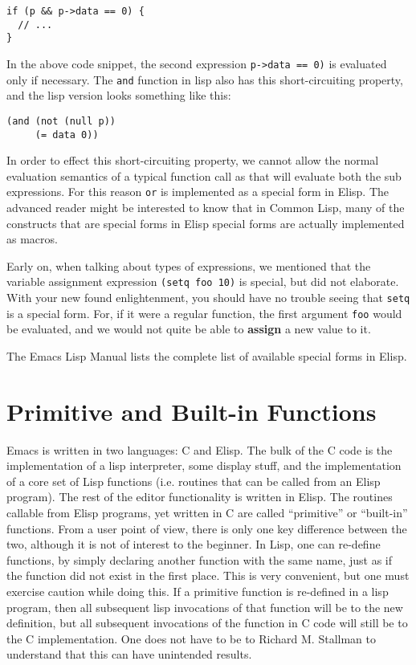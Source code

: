 \documentclass[10pt]{article}
\begin{document}
\begin{verbatim}
if (p && p->data == 0) {
  // ...
}
\end{verbatim}

In the above code snippet, the second expression \texttt{p->data == 0)} is
evaluated only if necessary.  The \texttt{and} function in lisp also has this
short-circuiting property, and the lisp version looks something like this:

\begin{verbatim}
(and (not (null p))
     (= data 0))
\end{verbatim}

In order to effect this short-circuiting property, we cannot allow the normal
evaluation semantics of a typical function call as that will evaluate both the
sub expressions.  For this reason \texttt{or} is implemented as a special form
in Elisp.  The advanced reader might be interested to know that in Common Lisp,
many of the constructs that are special forms in Elisp special forms are
actually implemented as macros.

Early on, when talking about types of expressions, we mentioned that the
variable assignment expression \texttt{(setq foo 10)} is special, but did not
elaborate.  With your new found enlightenment, you should have no trouble
seeing that \texttt{setq} is a special form.  For, if it were a regular
function, the first argument \texttt{foo} would be evaluated, and we would not
quite be able to \textbf{assign} a new value to it.

The Emacs Lisp Manual lists the complete list of available special forms in
Elisp.

\section{Primitive and Built-in Functions}

Emacs is written in two languages: C and Elisp.  The bulk of the C code is the
implementation of a lisp interpreter, some display stuff, and the
implementation of a core set of Lisp functions (i.e. routines that can be
called from an Elisp program).  The rest of the editor functionality is written
in Elisp.  The routines callable from Elisp programs, yet written in C are
called ``primitive'' or ``built-in'' functions.  From a user point of view,
there is only one key difference between the two, although it is not of
interest to the beginner.  In Lisp, one can re-define functions, by simply
declaring another function with the same name, just as if the function did not
exist in the first place.  This is very convenient, but one must exercise
caution while doing this.  If a primitive function is re-defined in a lisp
program, then all subsequent lisp invocations of that function will be to the
new definition, but all subsequent invocations of the function in C code will
still be to the C implementation.  One does not have to be to Richard M.
Stallman to understand that this can have unintended results.
\end{document}
